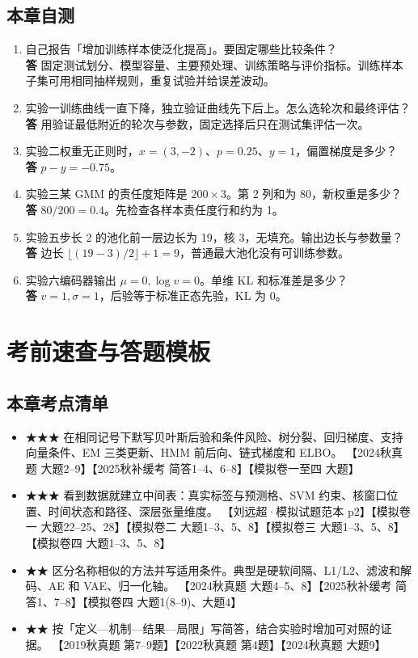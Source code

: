 \documentclass[UTF8,a4paper,zihao=-4,fontset=fandol]{ctexrep}
\begin{document}
\section{本章自测}
\begin{enumerate}
\item 自己报告「增加训练样本使泛化提高」。要固定哪些比较条件？\\
\textbf{答} 固定测试划分、模型容量、主要预处理、训练策略与评价指标。训练样本子集可用相同抽样规则，重复试验并给误差波动。
\item 实验一训练曲线一直下降，独立验证曲线先下后上。怎么选轮次和最终评估？\\
\textbf{答} 用验证最低附近的轮次与参数，固定选择后只在测试集评估一次。
\item 实验二权重无正则时，$x=(3,-2)$、$p=0.25$、$y=1$，偏置梯度是多少？\\
\textbf{答} $p-y=-0.75$。
\item 实验三某 GMM 的责任度矩阵是 $200\times3$。第 2 列和为 80，新权重是多少？\\
\textbf{答} $80/200=0.4$。先检查各样本责任度行和约为 1。
\item 实验五步长 2 的池化前一层边长为 19，核 3，无填充。输出边长与参数量？\\
\textbf{答} 边长 $\lfloor(19-3)/2\rfloor+1=9$，普通最大池化没有可训练参数。
\item 实验六编码器输出 $\mu=0,\log v=0$。单维 KL 和标准差是多少？\\
\textbf{答} $v=1,\sigma=1$，后验等于标准正态先验，KL 为 0。
\end{enumerate}

\chapter{考前速查与答题模板}

\section{本章考点清单}
\begin{itemize}
\item ★★★ 在相同记号下默写贝叶斯后验和条件风险、树分裂、回归梯度、支持向量条件、EM 三类更新、HMM 前后向、链式梯度和 ELBO。 【2024秋真题 大题2–9】【2025秋补缓考 简答1–4、6–8】【模拟卷一至四 大题】
\item ★★★ 看到数据就建立中间表：真实标签与预测格、SVM 约束、核窗口位置、时间状态和路径、深层张量维度。 【刘远超·模拟试题范本 p2】【模拟卷一 大题22–25、28】【模拟卷二 大题1–3、5、8】【模拟卷三 大题1–3、5、8】【模拟卷四 大题1–3、5、8】
\item ★★ 区分名称相似的方法并写适用条件。典型是硬软间隔、L1/L2、滤波和解码、AE 和 VAE、归一化轴。 【2024秋真题 大题4–5、8】【2025秋补缓考 简答1、7–8】【模拟卷四 大题1(8–9)、大题4】
\item ★★ 按「定义—机制—结果—局限」写简答，结合实验时增加可对照的证据。 【2019秋真题 第7–9题】【2022秋真题 第4题】【2024秋真题 大题9】
\end{itemize}
\end{document}
